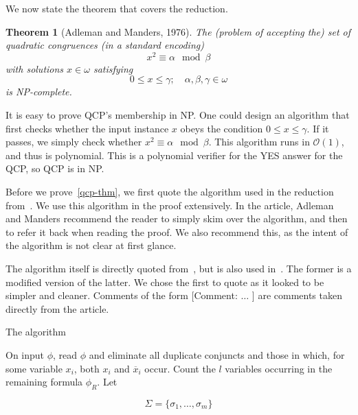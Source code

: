 \documentclass{amsart}
\makeatletter
\def\subsection{\@startsection{subsection}{3}%
  \z@{.5\linespacing\@plus.7\linespacing}{.1\linespacing}%
  {\normalfont}}
\newcommand{\ov}{\overline}
\theoremstyle{plain}
\newtheorem{theorem}{Theorem}
\numberwithin{equation}{section}
\newcommand{\bigo}{\mathcal{O}}
\makeatother
\begin{document}
We now state the theorem that covers the reduction.

\begin{theorem}[Adleman and Manders, 1976]\label{qcp-thm}
  The (problem of accepting the) set of quadratic congruences (in a standard encoding)
  \begin{equation*}
    x^2\equiv\alpha\mod\beta
  \end{equation*}
  with solutions $x\in\omega$ satisfying
  \begin{equation*}
    0\leq x\leq\gamma;\quad \alpha,\beta,\gamma\in\omega
  \end{equation*}
  is NP-complete.
\end{theorem}

It is easy to prove QCP's membership in NP\@. One could design an algorithm that first checks
whether the input instance $x$ obeys the condition $0\leq x\leq\gamma$. If it passes, we simply
check whether $x^2\equiv\alpha\mod\beta$. This algorithm runs in $\bigo(1)$, and thus is
polynomial. This is a polynomial verifier for the YES answer for the QCP, so QCP is in NP\@.

Before we prove~\autoref{qcp-thm}, we first quote the algorithm used in the reduction
from~\cite{qcp2}. We use this algorithm in the proof extensively. In the article, Adleman and
Manders recommend the reader to simply skim over the algorithm, and then to refer it back when
reading the proof. We also recommend this, as the intent of the algorithm is not clear at first
glance.

The algorithm itself is directly quoted from~\cite{qcp2}, but is also used in~\cite{qcp1}. The
former is a modified version of the latter. We chose the first to quote as it looked to be simpler
and cleaner. Comments of the form [Comment: $\ldots$ ] are comments taken directly from the
article.

\subsection{The algorithm}

On input $\phi$, read $\phi$ and eliminate all duplicate conjuncts and those in which, for some
variable $x_i$, both $x_i$ and $\ov{x}_i$ occur. Count the $l$ variables occurring in the remaining
formula $\phi_R$. Let

\begin{equation*}
  \Sigma = \{\sigma_1,\ldots,\sigma_m\}
\end{equation*}
\end{document}
